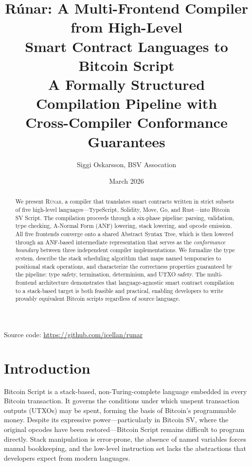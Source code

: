 \documentclass[11pt,a4paper]{article}
\title{%
  \textbf{Rúnar: A Multi-Frontend Compiler from High-Level\\
  Smart Contract Languages to Bitcoin Script}\\[0.5em]
  \large A Formally Structured Compilation Pipeline with\\
  Cross-Compiler Conformance Guarantees
}
\author{Siggi Oskarsson, BSV Assocation}
\date{March 2026}
\newcommand{\runar}{\textsc{Rúnar}}
\begin{document}
\maketitle

\vspace{-1em}
\begin{center}
\small Source code: \url{https://github.com/icellan/runar}
\end{center}

\begin{abstract}
We present \runar{}, a compiler that translates smart contracts written in
strict subsets of five high-level languages---TypeScript, Solidity, Move, Go,
and Rust---into Bitcoin SV Script. The compilation proceeds through a
six-phase pipeline: parsing, validation, type checking, A-Normal Form (ANF)
lowering, stack lowering, and opcode emission. All five frontends converge
onto a shared Abstract Syntax Tree, which is then lowered through an
ANF-based intermediate representation that serves as the \emph{conformance
boundary} between three independent compiler implementations. We formalize
the type system, describe the stack scheduling algorithm that maps named
temporaries to positional stack operations, and characterize the correctness
properties guaranteed by the pipeline: type safety, termination, determinism,
and UTXO safety. The multi-frontend architecture demonstrates that
language-agnostic smart contract compilation to a stack-based target is
both feasible and practical, enabling developers to write provably
equivalent Bitcoin scripts regardless of source language.
\end{abstract}

\tableofcontents
\newpage

\section{Introduction}
\label{sec:intro}

Bitcoin Script is a stack-based, non-Turing-complete language embedded in
every Bitcoin transaction. It governs the conditions under which unspent
transaction outputs (UTXOs) may be spent, forming the basis of Bitcoin's
programmable money. Despite its expressive power---particularly in Bitcoin SV,
where the original opcodes have been restored---Bitcoin Script remains
difficult to program directly. Stack manipulation is error-prone, the absence
of named variables forces manual bookkeeping, and the low-level instruction
set lacks the abstractions that developers expect from modern languages.
\end{document}

